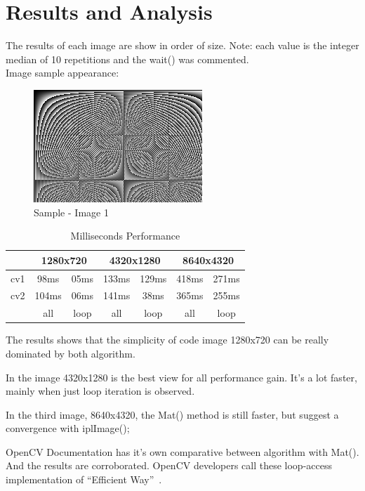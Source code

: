 \section{Results and Analysis}\label{sec:4}
\graphicspath{ {../} }
    The results of each image are show in order of size. Note: each value is the integer median of 10 repetitions and the wait() was commented.\\

    Image sample appearance:

    \begin{figure}[h!]
        \caption{Sample - Image 1}
        \includegraphics{sample.png}
    \end{figure}

\begin{table}[h!]
    \centering
    \caption{Milliseconds Performance}
    \label{tab1}
        \begin{tabular}{ccccccc}
        \hline
            & \multicolumn{2}{c}{1280x720} & \multicolumn{2}{c}{4320x1280} & \multicolumn{2}{c}{8640x4320} \\\hline
        cv1 & 98ms          & 05ms         & 133ms         & 129ms         & 418ms         & 271ms         \\\hline
        cv2 & 104ms         & 06ms         & 141ms         & 38ms          & 365ms         & 255ms         \\\hline
            & all           & loop         & all           & loop          & all           & loop          \\\hline
\end{tabular}
\end{table}

    The results shows that the simplicity of code image 1280x720 can be really dominated by both algorithm.  

    In the image 4320x1280 is the best view for all performance gain. It's a lot faster, mainly when just loop iteration is observed.

    In the third image, 8640x4320, the Mat() method is still faster, but suggest a convergence with iplImage(); 

    OpenCV Documentation has it's own comparative between algorithm with Mat(). And the results are corroborated. OpenCV developers call these loop-access implementation of ``Efficient Way''~\cite{GoodWay}.  